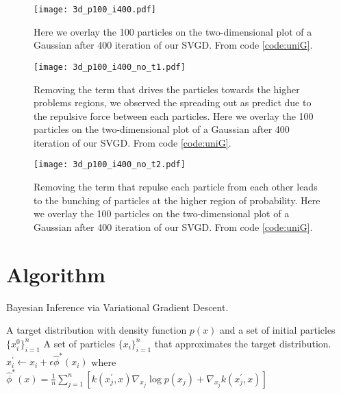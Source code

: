 \documentclass[11pt]{isr} %
\begin{document}
\begin{figure}[ht]
\begin{center}
\texttt{[image: 3d\_p100\_i400.pdf]}
\caption{Here we overlay the 100 particles on the two-dimensional plot of a Gaussian after 400 iteration of our SVGD. From code \ref{code:uniG}. }
\label{fig:uni}
\end{center}
\end{figure}

\begin{figure}[ht]
\begin{center}
\texttt{[image: 3d\_p100\_i400\_no\_t1.pdf]}
\caption{Removing the term that drives the particles towards the higher problems regions, we observed the spreading out as predict due to the repulsive force between each particles.  Here we overlay the 100 particles on the two-dimensional plot of a Gaussian after 400 iteration of our SVGD. From code \ref{code:uniG}.}
\label{fig:uni_no_t1}
\end{center}
\end{figure}

\begin{figure}[ht]
\begin{center}
\texttt{[image: 3d\_p100\_i400\_no\_t2.pdf]}
\caption{Removing the term that repulse each particle from each other leads to the bunching of particles at the higher region of probability. Here we overlay the 100 particles on the two-dimensional plot of a Gaussian after 400 iteration of our SVGD. From code \ref{code:uniG}.}
\label{fig:uni_no_t2}
\end{center}
\end{figure}


\clearpage


\section{Algorithm}



\begin{algorithm}
  \caption{Bayesian Inference via Variational Gradient Descent. \cite{liu2019stein} }\label{alg:svgd}
\begin{algorithmic}[1]
  \Require A target distribution with density function $p(x)$ and a set of initial particles $\{x^{0}_{i}\}_{i=1}^n$
\Ensure A set of particles $\{x_i\}_{i=1}^n$ that approximates the target distribution.
        \State $x_{i}^{\prime} \gets x_{i} + \epsilon \hat{\phi}^{\ast}(x_{i})$ 
        \State where $\hat{\phi}^{\ast}(x) = \frac{1}{n} \sum_{j=1}^{n} \left[k(x_{j}^{\prime}, x) \nabla_{x_{j}} \log p(x_{j}) + \nabla_{x_{j}} k(x_{j}^{\prime}, x)\right]$
    \EndFor
\EndFor
\end{algorithmic}
\end{algorithm}
\end{document}
